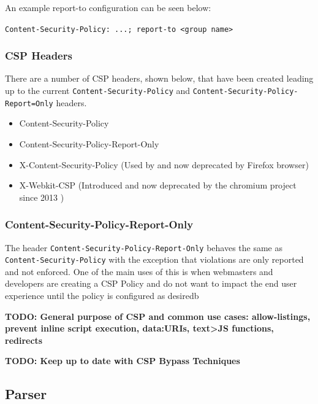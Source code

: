 \documentclass{mscreport}
\begin{document}
\vspace{0.3cm} \noindent
An example report-to configuration can be seen below:

\vspace{0.3cm} \noindent
\texttt{Content-Security-Policy: ...; report-to <group name>}

\subsubsection{CSP Headers}

There are a number of CSP headers, shown below, that have been created leading up to the current \texttt{Content-Security-Policy} and \texttt{Content-Security-Policy-Report=Only} headers.

\begin{itemize}
	\setlength\itemsep{0.1em}
	\item Content-Security-Policy
	\item Content-Security-Policy-Report-Only
	\item X-Content-Security-Policy (Used by and now deprecated by Firefox browser)
	\item X-Webkit-CSP (Introduced and now deprecated by the chromium project since 2013 \cite{Google_undated-ct})
\end{itemize}


\subsubsection{Content-Security-Policy-Report-Only}

The header \texttt{Content-Security-Policy-Report-Only} behaves the same as \newline \texttt{Content-Security-Policy} with the exception that violations are only reported and not enforced. One of the main uses of this is when webmasters and developers are creating a CSP Policy and do not want to impact the end user experience until the policy is configured as desiredb

\vspace{0.3cm} \noindent
\textbf{TODO: General purpose of CSP and common use cases: allow-listings, prevent inline script execution, data:URIs, text>JS functions, redirects}

\vspace{0.3cm} \noindent
\textbf{TODO: Keep up to date with CSP Bypass Techniques}

\subsection{Parser}
\end{document}

